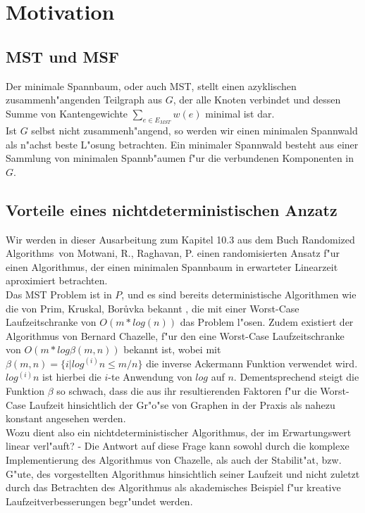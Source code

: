 \section{Motivation}

\subsection{MST und MSF}
Der minimale Spannbaum, oder auch MST, stellt einen azyklischen 
    zusammenh"angenden Teilgraph aus $G$, der alle Knoten verbindet und
    dessen Summe von Kantengewichte $\sum_{e \in E_{MST}} w(e)$
    minimal ist dar.\\
Ist $G$ selbst nicht zusammenh"angend, so werden wir einen minimalen Spannwald
    als n"achst beste L"osung betrachten.
    Ein minimaler Spannwald besteht aus einer Sammlung von minimalen 
    Spannb"aumen f"ur die verbundenen Komponenten in $G$.\\

\subsection{Vorteile eines nichtdeterministischen Anzatz}

Wir werden in dieser Ausarbeitung zum Kapitel 10.3 aus dem Buch
    \glqq Randomized Algorithms\grqq\ von Motwani, R., Raghavan, P.  
    einen
    randomisierten Ansatz f"ur einen Algorithmus, der einen minimalen Spannbaum
    in erwarteter Linearzeit aproximiert betrachten.\\
Das MST Problem ist in $P$, und es sind bereits 
    deterministische Algorithmen wie die von
    Prim, Kruskal, Bor\r uvka bekannt
    , die mit einer Worst-Case Laufzeitschranke 
    von $O(m * log(n))$ das Problem l"osen.
    Zudem existiert der Algorithmus von Bernard Chazelle, f"ur den eine
    Worst-Case Laufzeitschranke von $O(m * log \beta(m,n))$ bekannt ist, wobei
    mit
    $\beta(m,n) = \{i | log^{(i)} n \leq m / n\}$ die inverse Ackermann Funktion
    verwendet wird. 
    $log^{(i)} n$ ist hierbei die $i$-te Anwendung von $log$ auf $n$.
    Dementsprechend steigt die Funktion $\beta$ so schwach, dass die
    aus ihr resultierenden Faktoren f"ur die Worst-Case Laufzeit hinsichtlich
    der Gr"o"se von Graphen in der Praxis als nahezu konstant angesehen werden.\\
Wozu dient also ein nichtdeterministischer Algorithmus, der im Erwartungswert 
    linear verl"auft?
    - Die Antwort auf diese Frage kann sowohl durch die komplexe Implementierung
    des Algorithmus von Chazelle, als auch der Stabilit"at, bzw. G"ute,
    des vorgestellten Algorithmus hinsichtlich seiner Laufzeit
    und nicht zuletzt durch das Betrachten des Algorithmus als akademisches
    Beispiel f"ur kreative Laufzeitverbesserungen begr"undet werden.\\
